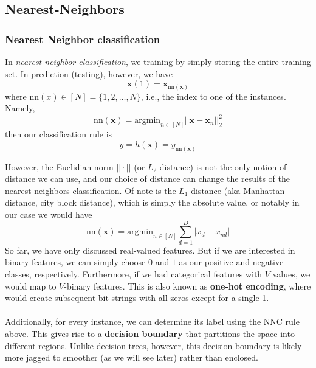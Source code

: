 \documentclass[11 pt]{scrartcl}
\begin{document}
\subsection{Nearest-Neighbors}
\subsubsection{Nearest Neighbor classification}
\begin{definition}
  In \emph{nearest neighbor classification}, we training by simply storing the entire training set. In prediction (testing), however, we have
$$
\textbf{x}(1) = \textbf{x}_{\text{nn}(\textbf{x})}
$$
where nn$(x) \in [N] = \{1, 2, \hdots, N \}$, i.e., the index to one of the instances. Namely,
$$
\text{nn}(\textbf{x}) = \text{argmin}_{n \in [N]} ||\textbf{x} - \textbf{x}_n||_2^2
$$
then our classification rule is
$$
y = h(\textbf{x}) = y_{\text{nn}(\textbf{x})}
$$
\end{definition}
However, the Euclidian norm $|| \cdot ||$ (or $L_2$ distance) is not the only notion of distance we can use, and our choice of distance can change the results of the nearest neighbors classification. Of note is the $L_1$ distance (aka Manhattan distance, city block distance), which is simply the absolute value, or notably in our case we would have
$$
\text{nn}(\textbf{x}) = \text{argmin}_{n \in [N]} \sum_{d = 1}^D |x_d - x_{nd}|
$$
So far, we have only discussed real-valued features. But if we are interested in binary features, we can simply choose $0$ and $1$ as our positive and negative classes, respectively. Furthermore, if we had categorical features with $V$ values, we would map to $V$-binary features. This is also known as \textbf{one-hot encoding}, where would create subsequent bit strings with all zeros except for a single 1. 
\\\\
Additionally, for every instance, we can determine its label using the NNC rule above. This gives rise to a \textbf{decision boundary} that partitions the space into different regions. Unlike decision trees, however, this decision boundary is likely more jagged to smoother (as we will see later) rather than enclosed.
\newpage
\end{document}
